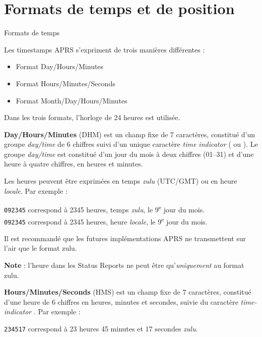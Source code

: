 \chapter[FORMATS DE TEMPS ET DE POSITION]{Formats de temps et de
position}\label{formats-de-temps-et-de-position}

\begin{aprssideblock}{Formats de temps}
\label{formats-de-temps}
Les timestamps APRS s'expriment de trois manières différentes :

\begin{itemize}
\tightlist
\item
  Format Day/Hours/Minutes
\item
  Format Hours/Minutes/Seconds
\item
  Format Month/Day/Hours/Minutes
\end{itemize}

Dans les trois formats, l'horloge de 24 heures est utilisée.

\textbf{Day/Hours/Minutes} (DHM) est un champ fixe de 7 caractères,
constitué d'un groupe \emph{day/time} de 6 chiffres suivi d'un unique
caractère \emph{time indicator} ( ou \lit{/}). Le groupe
\emph{day/time} est constitué d'un jour du mois à deux chiffres
(01--31) et d'une heure à quatre chiffres, en heures et minutes.

Les heures peuvent être exprimées en temps \emph{zulu} (UTC/GMT) ou en
heure \emph{locale}. Par exemple :

\begin{aprsexample}
\texttt{092345} \exgap correspond à 2345 heures, temps
\emph{zulu}, le 9\textsuperscript{e} jour du mois. \\
\texttt{092345}\lit{/} \exgap correspond à 2345 heures, heure
\emph{locale}, le 9\textsuperscript{e} jour du mois.
\end{aprsexample}

Il est recommandé que les futures implémentations APRS ne transmettent
sur l'air que le format zulu.

\textbf{Note} : l'heure dans les Status Reports ne peut être
qu'\emph{uniquement} au format zulu.

\textbf{Hours/Minutes/Seconds} (HMS) est un champ fixe de 7 caractères,
constitué d'une heure de 6 chiffres en heures, minutes et secondes,
suivie du caractère \emph{time-indicator} . Par exemple :

\begin{aprsexample}
\texttt{234517} \exgap correspond à 23 heures 45 minutes et
17 secondes \emph{zulu}.
\end{aprsexample}


\end{aprssideblock}
